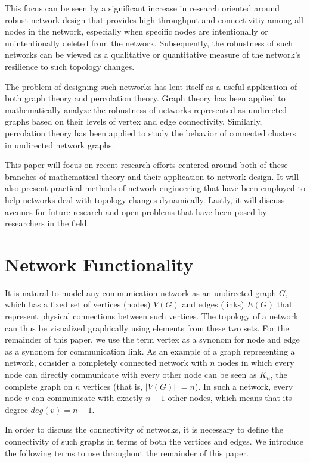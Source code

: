 \documentclass[11pt]{article}
\begin{document}
This focus can be seen by a significant increase in research oriented around robust network design that provides high throughput and connectivitiy among all nodes in the network, especially when specific nodes are intentionally or unintentionally deleted from the network. Subsequently, the robustness of such networks can be viewed as a qualitative or quantitative measure of the network's resilience to such topology changes.

The problem of designing such networks has lent itself as a useful application of both graph theory and percolation theory. Graph theory has been applied to mathematically analyze the robustness of networks represented as undirected graphs based on their levels of vertex and edge connectivity. Similarly, percolation theory has been applied to study the behavior of connected clusters in undirected network graphs. 

This paper will focus on recent research efforts centered around both of these branches of 
mathematical theory and their application to network design. It will also present practical methods of
network engineering that have been employed to help networks deal with topology changes dynamically.
Lastly, it will discuss avenues for future research and open problems that have been posed by 
researchers in the field.

\section{Network Functionality}

It is natural to model any communication network as an undirected graph $G$, which has a fixed 
set of vertices (nodes) $V(G)$ and edges (links) $E(G)$ that represent physical connections between such vertices. The topology of a network
can thus be visualized graphically using elements from these two sets. For the remainder of this paper,
we use the term vertex as a synonom for node and edge as a synonom for communication link. As an example of a graph representing a network, consider a completely connected network with $n$ nodes in which every node can directly communicate with every other 
node can be seen as $K_{n}$, the complete graph on $n$ vertices (that is, $|V(G)|$ $= n$). In such a network, every node $v$ can
communicate with exactly $n-1$ other nodes, which means that its degree $deg(v) = n-1$. 

In order to discuss the connectivity of networks, it is necessary to define the connectivity of such
graphs in terms of both the vertices and edges. We introduce the following terms to use throughout 
the remainder of this paper.
\end{document}
